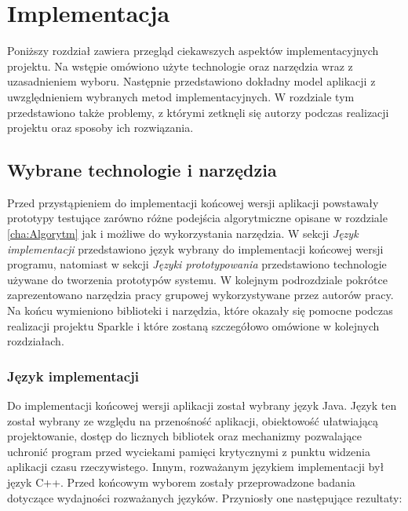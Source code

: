 ﻿\chapter {Implementacja}
\label{cha:implementacja}
Poniższy rozdział zawiera przegląd ciekawszych aspektów implementacyjnych projektu.
Na wstępie omówiono użyte technologie oraz narzędzia wraz z uzasadnieniem wyboru. Następnie przedstawiono dokładny model aplikacji z uwzględnieniem wybranych metod implementacyjnych. 
W rozdziale tym przedstawiono także problemy, z którymi zetknęli się autorzy podczas realizacji projektu oraz sposoby ich rozwiązania.
\section {Wybrane technologie i narzędzia}
Przed przystąpieniem do implementacji końcowej wersji aplikacji powstawały prototypy testujące zarówno różne podejścia algorytmiczne opisane w rozdziale \ref{cha:Algorytm} jak i możliwe do wykorzystania narzędzia. W sekcji \textit{Język implementacji} przedstawiono język wybrany do implementacji końcowej wersji programu, natomiast w sekcji \textit{Języki prototypowania} przedstawiono technologie używane do tworzenia prototypów systemu. 
W kolejnym podrozdziale pokrótce zaprezentowano narzędzia pracy grupowej wykorzystywane przez autorów pracy. Na końcu wymieniono biblioteki i narzędzia, które okazały się pomocne podczas realizacji projektu Sparkle i które zostaną szczegółowo omówione w kolejnych rozdziałach.
\subsection{Język implementacji}
Do implementacji końcowej wersji aplikacji został wybrany język Java.
Język ten został wybrany ze względu na przenośność aplikacji, obiektowość ułatwiającą projektowanie, dostęp do licznych 
bibliotek oraz mechanizmy pozwalające uchronić program przed wyciekami pamięci krytycznymi z punktu widzenia aplikacji czasu rzeczywistego. Innym, rozważanym językiem implementacji był język C++. Przed końcowym wyborem zostały przeprowadzone badania dotyczące wydajności rozważanych języków. Przyniosły one następujące rezultaty:
\begin{itemize}

\end{itemize}

